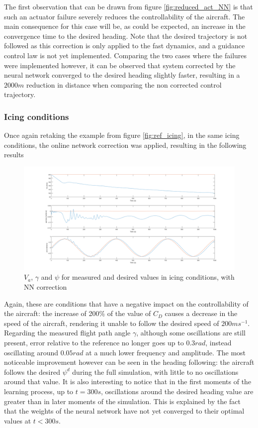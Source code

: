 The first observation that can be drawn from figure \ref{fig:reduced_act_NN} is that such an actuator failure severely reduces the controllability of the aircraft. The main consequence for this case will be, as could be expected, an increase in the convergence time to the desired heading. Note that the desired trajectory is not followed as this correction is only applied to the fast dynamics, and a guidance control law is not yet implemented. Comparing the two cases where the failures were implemented however, it can be observed that system corrected by the neural network converged to the desired heading slightly faster, resulting in a $2000m$ reduction in distance when comparing the non corrected control trajectory.


\subsubsection{Icing conditions}

Once again retaking the example from figure \ref{fig:ref_icing}, in the same icing conditions, the online network correction was applied, resulting in the following results

\begin{figure}[H]
\centering
\includegraphics[width=1\textwidth]{Figures/Results/ref_icing_NN.PNG}
\caption[Reference following in icing conditions with NN correction]{$V_a$, $\gamma$ and $\psi$ for measured and desired values in icing conditions, with NN correction}
\label{fig:ref_icing_NN}
\end{figure}

Again, these are conditions that have a negative impact on the controllability of the aircraft: the increase of 200\% of the value of $C_D$ causes a decrease in the speed of the aircraft, rendering it unable to follow the desired speed of $200ms^{-1}$. Regarding the measured flight path angle $\gamma$, although  some oscillations are still present, error relative to the reference no longer goes up to $0.3 rad$, instead oscillating around $0.05rad$ at a much lower frequency and amplitude. The most noticeable improvement however can be seen in the heading following: the aircraft follows the desired $\psi^d$ during the full simulation, with little to no oscillations around that value. It is also interesting to notice that in the first moments of the learning process, up to $t=300s$, oscillations around the desired heading value are greater than in later moments of the simulation. This is explained by the fact that the weights of the neural network have not yet converged to their optimal values at $t<300s$.


